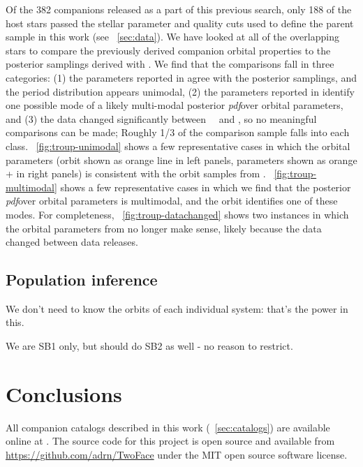 \documentclass[modern, letterpaper]{aastex62}
\newcommand{\apogee}{\project{\acronym{APOGEE}}}
\newcommand{\thejoker}{\project{The~Joker}}
\newcommand{\DR}{\acronym{DR14}}
\newcommand{\DRtw}{\acronym{DR12}}
\newcommand{\pdf}{\textit{pdf}}
\begin{document}
Of the 382 companions released as a part of this previous search, only 188 of
the host stars passed the stellar parameter and quality cuts used to define the
parent sample in this work (see \sectionname~\ref{sec:data}).
We have looked at all of the overlapping stars to compare the previously derived
companion orbital properties to the posterior samplings derived with \thejoker.
We find that the comparisons fall in three categories:
(1) the parameters reported in \citet{Troup:2016} agree with the posterior
samplings, and the period distribution appears unimodal,
(2) the parameters reported in \citet{Troup:2016} identify one possible mode of
a likely multi-modal posterior \pdf over orbital parameters, and
(3) the data changed significantly between \apogee\ \DRtw\ and \DR, so
no meaningful comparisons can be made; Roughly 1/3 of the comparison sample
falls into each class.
\figurename~\ref{fig:troup-unimodal} shows a few representative cases in which
the \citet{Troup:2016} orbital parameters (orbit shown as orange line in left
panels, parameters shown as orange + in right panels) is consistent with the
orbit samples from \thejoker.
\figurename~\ref{fig:troup-multimodal} shows a few representative cases in which
we find that the posterior \pdf over orbital parameters is multimodal, and the
\citet{Troup:2016} orbit identifies one of these modes.
For completeness, \figurename~\ref{fig:troup-datachanged} shows two instances in
which the orbital parameters from \citet{Troup:2016} no longer make sense,
likely because the data changed between data releases.

\subsection{Population inference}


We don't need to know the orbits of each individual system: that's the power in
this.

We are SB1 only, but should do SB2 as well - no reason to restrict.

\section{Conclusions}

All companion catalogs described in this work (\sectionname~\ref{sec:catalogs})
are available online at .
The source code for this project is open source and available from
\url{https://github.com/adrn/TwoFace} under the MIT open source software
license.
\end{document}
